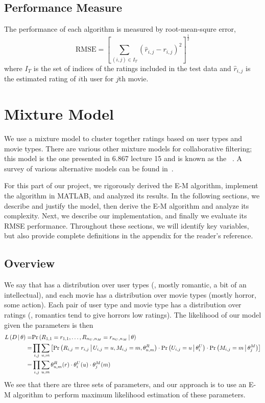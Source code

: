 \documentclass{article}
\begin{document}
\subsection{Performance Measure}
The performance of each algorithm is measured by root-mean-squre
error,
\begin{equation}
  \textrm{RMSE} = \left[
    \sum_{(i,j) \in I_T} ({\hat r}_{i,j} - r_{i,j})^2
  \right]^\frac{1}{2}
\end{equation}
where $I_T$ is the set of indices of the ratings included in the test
data and ${\hat r}_{i,j}$ is the estimated rating of $i$th user for
$j$th movie.

\section{Mixture Model}

We use a mixture model to cluster together ratings based on user types
and movie types. There are various other mixture models for
collaborative filtering; this model is the one presented in 6.867
lecture 15 and is known as the ~\cite{si03flexible}. A survey of various alternative models
can be found in~\cite{cmu-study}.

For this part of our project, we rigorously derived the E-M algorithm,
implement the algorithm in MATLAB, and analyzed its results. In the
following sections, we describe and justify the model, then derive the
E-M algorithm and analyze its complexity. Next, we describe our
implementation, and finally we evaluate its RMSE
performance. Throughout these sections, we will identify key
variables, but also provide complete definitions in the appendix for
the reader's reference.

\subsection{Overview}

We say that  has a distribution over user types (\eg,
mostly romantic, a bit of an intellectual), and each movie has a
distribution over movie types (mostly horror, some action). Each pair
of user type and movie type has a distribution over ratings (\eg,
romantics tend to give horrors low ratings). The likelihood of
our model given the parameters is then
\begin{align}
  {\ensuremath{ L \left( D \,\middle|\, \theta \right) }}
  =& {{\Pr \left(   R_{1,1} = r_{1,1}, \dots, R_{n_U,n_M} = r_{n_U,n_M}  \,\middle|\, 
    \theta   \right)}} \\
  =& \prod_{i,j} \sum_{u,m} \left[
    {{\Pr \left(   R_{i,j} = r_{i,j}  \,\middle|\,  U_{i,j} = u, M_{i,j} = m,
      \theta^R_{u,m}   \right)}} \cdot 
    {{\Pr \left(   U_{i,j} = u  \,\middle|\,  \theta^U_i   \right)}} \cdot
    {{\Pr \left(   M_{i,j} = m  \,\middle|\,  \theta^M_j   \right)}}
  \right] \\
  =& \prod_{i,j} \sum_{u,m}
  \theta^R_{u,m}(r) \cdot \theta^U_i(u) \cdot \theta^M_j(m)
\end{align}
We see that there are three sets of parameters, and our approach is to
use an E-M algorithm to perform maximum likelihood estimation of these
parameters.
\end{document}
